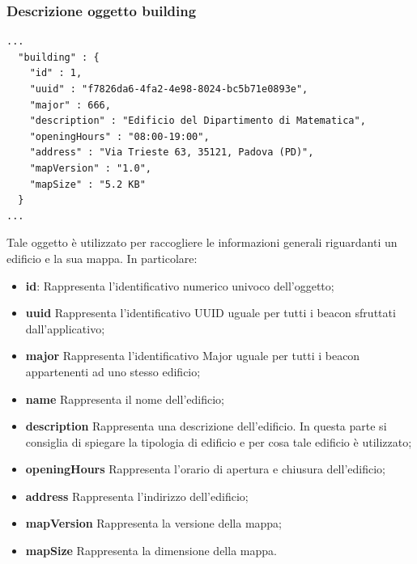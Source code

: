 \documentclass[../ManualeSviluppatore.tex]{subfiles}
\begin{document}
	\subsubsection{Descrizione oggetto building}
		\begin{lstlisting}
...
  "building" : {
    "id" : 1,
    "uuid" : "f7826da6-4fa2-4e98-8024-bc5b71e0893e",
    "major" : 666,
    "description" : "Edificio del Dipartimento di Matematica",
    "openingHours" : "08:00-19:00",
    "address" : "Via Trieste 63, 35121, Padova (PD)",
    "mapVersion" : "1.0",
    "mapSize" : "5.2 KB"
  }
...
		\end{lstlisting}
		Tale oggetto è utilizzato per raccogliere le informazioni generali riguardanti un edificio e la sua mappa. In particolare:
		\begin{itemize}
			\item \textbf{id}: Rappresenta l'identificativo numerico univoco dell'oggetto;
			\item \textbf{uuid} Rappresenta l'identificativo UUID uguale per tutti i beacon sfruttati dall'applicativo;
			\item \textbf{major} Rappresenta l'identificativo Major uguale per tutti i beacon appartenenti ad uno stesso edificio;
			\item \textbf{name} Rappresenta il nome dell'edificio;
			\item \textbf{description} Rappresenta una descrizione dell'edificio. In questa parte si consiglia di spiegare la tipologia di edificio e per cosa tale edificio è utilizzato;
			\item \textbf{openingHours} Rappresenta l'orario di apertura e chiusura dell'edificio;
			\item \textbf{address} Rappresenta l'indirizzo dell'edificio;
			\item \textbf{mapVersion} Rappresenta la versione della mappa;
			\item \textbf{mapSize} Rappresenta la dimensione della mappa.
		\end{itemize}
		
\end{document}
